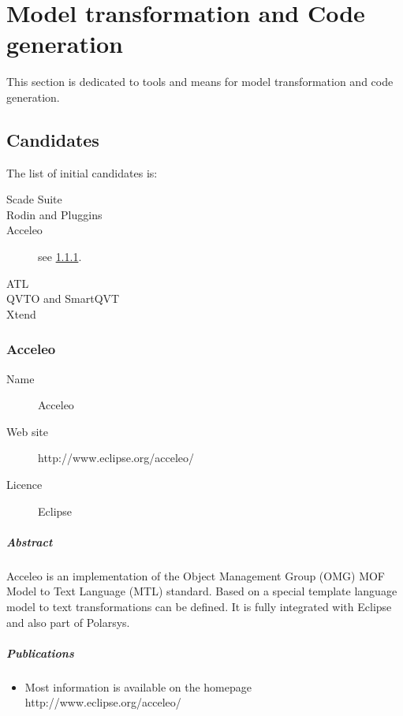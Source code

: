 
\chapter{Model transformation and Code generation}
\label{sec:transfo}

This section is dedicated to tools and means for model transformation and code generation.



\section{Candidates}


The list of initial candidates is:

\begin{description}
\item [Scade Suite]
\item [Rodin and Pluggins]
\item [Acceleo] see \ref{sec:Acceleo}.
\item [ATL]
\item [QVTO and SmartQVT]
\item [Xtend]
\end{description}



\subsection{Acceleo}
\label{sec:Acceleo}

\begin{description}
\item[Name] Acceleo
\item[Web site] http://www.eclipse.org/acceleo/
\item[Licence] Eclipse
\end{description}

\paragraph{Abstract} %
Acceleo is an implementation of the Object Management Group (OMG) MOF Model to Text Language (MTL) standard. Based on a special template language model to text transformations can be defined. It is fully integrated with Eclipse and also part of Polarsys.

\paragraph{Publications} %
\begin{itemize}
\item Most information is available on the homepage http://www.eclipse.org/acceleo/
\end{itemize}

